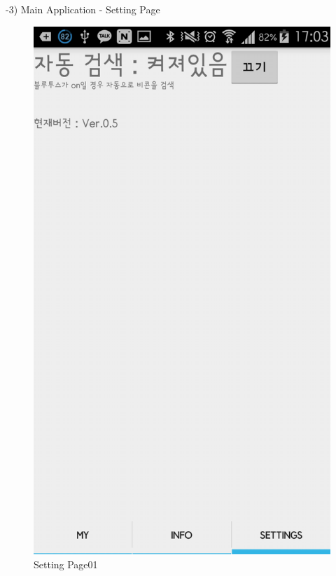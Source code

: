 \documentclass[conference]{IEEEtran}
\begin{document}
-3) Main Application - Setting Page
\begin{figure}[htbp]
\begin{center}
    \includegraphics[scale=0.2]{img_capture09}
    \caption{Setting Page01} 
\end{center}
\end{figure}
\end{document}
